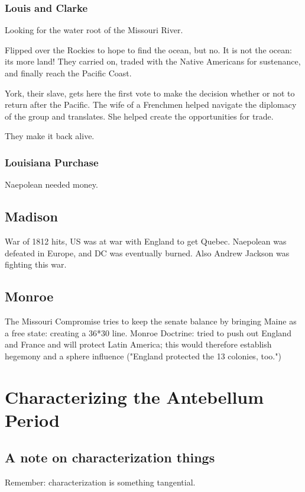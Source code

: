 \documentclass[11pt]{article}
\begin{document}
\subsubsection{Louis and Clarke}
\label{sec:orgd525b4a}
Looking for the water root of the Missouri River.

Flipped over the Rockies to hope to find the ocean, but no. It is not the ocean: its more land! They carried on, traded with the Native Americans for sustenance, and finally reach the Pacific Coast.

York, their slave, gets here the first vote to make the decision whether or not to return after the Pacific. The wife of a Frenchmen helped navigate the diplomacy of the group and translates. She helped create the opportunities for trade.

They make it back alive.

\subsubsection{Louisiana Purchase}
\label{sec:org2e61ee6}
Naepolean needed money.

\subsection{Madison}
\label{sec:org0d3f6a7}
War of 1812 hits, US was at war with England to get Quebec. Naepolean was defeated in Europe, and DC was eventually burned. Also Andrew Jackson was fighting this war.

\subsection{Monroe}
\label{sec:org8567911}
The Missouri Compromise tries to keep the senate balance by bringing Maine as a free state: creating a 36*30 line. Monroe Doctrine: tried to push out England and France and will protect Latin America; this would therefore establish hegemony and a sphere influence ("England protected the 13 colonies, too.")

\section{Characterizing the Antebellum Period}
\label{sec:org006e27d}
\subsection{A note on characterization things}
\label{sec:orgc339843}
Remember: characterization is something tangential.
\end{document}
